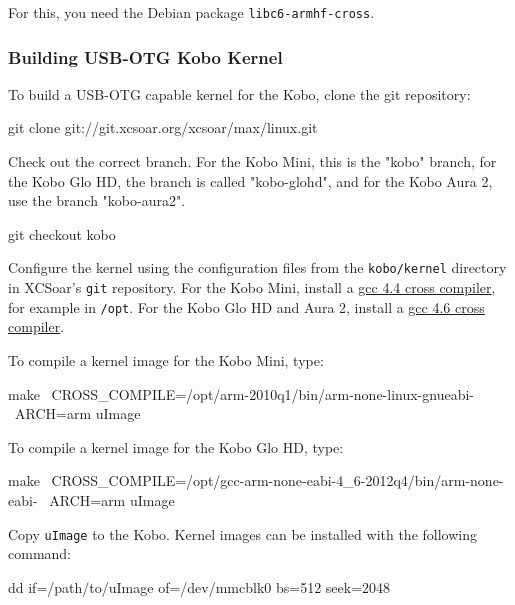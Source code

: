 For this, you need the Debian package \verb|libc6-armhf-cross|.

\subsubsection{Building USB-OTG Kobo Kernel}

To build a USB-OTG capable kernel for the Kobo, clone the git
repository:

\begin{verbatim*}
git clone git://git.xcsoar.org/xcsoar/max/linux.git
\end{verbatim*}

Check out the correct branch. For the Kobo Mini, this is the "kobo" branch,
for the Kobo Glo HD, the branch is called "kobo-glohd", and for the Kobo Aura 2,
use the branch "kobo-aura2".

\begin{verbatim*}
git checkout kobo
\end{verbatim*}

Configure the kernel using the configuration files from the \texttt{kobo/kernel}
directory in XCSoar's \texttt{git} repository. For the Kobo Mini, install a
\href{http://openlinux.amlogic.com:8000/download/ARM/gnutools/arm-2010q1-202-arm-none-linux-gnueabi-i686-pc-linux-gnu.tar.bz2}{gcc
  4.4 cross compiler}, for example in \texttt{/opt}. For the Kobo Glo HD and
Aura 2, install a
\href{https://launchpad.net/gcc-arm-embedded/4.6/4.6-2012-q4-update/+download/gcc-arm-none-eabi-4_6-2012q4-20121016.tar.bz2}{gcc
  4.6 cross compiler}.

To compile a kernel image for the Kobo Mini, type:

\begin{verbatim*}
make \
  CROSS_COMPILE=/opt/arm-2010q1/bin/arm-none-linux-gnueabi- \
  ARCH=arm uImage
\end{verbatim*}

To compile a kernel image for the Kobo Glo HD, type:

\begin{verbatim*}
make \
  CROSS_COMPILE=/opt/gcc-arm-none-eabi-4_6-2012q4/bin/arm-none-eabi- \
  ARCH=arm uImage
\end{verbatim*}

Copy \texttt{uImage} to the Kobo.  Kernel images can be installed with
the following command:

\begin{verbatim*}
dd if=/path/to/uImage of=/dev/mmcblk0 bs=512 seek=2048
\end{verbatim*}

